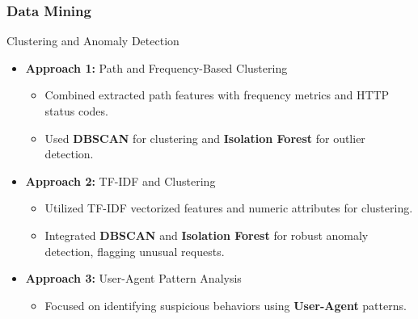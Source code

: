 \documentclass[10pt, a4paper]{beamer}
\begin{document}
	
	\begin{frame}
		\frametitle{Data Mining}
		
		\begin{block}{Clustering and Anomaly Detection}
			
			\begin{itemize}
				\item \textbf{Approach 1:} Path and Frequency-Based Clustering
				\begin{itemize}
					\item Combined extracted path features with frequency metrics and HTTP status codes.
					\item Used \textbf{DBSCAN} for clustering and \textbf{Isolation Forest} for outlier detection.
				\end{itemize}
				\item \textbf{Approach 2:} TF-IDF and Clustering
				\begin{itemize}
					\item Utilized TF-IDF vectorized features and numeric attributes for clustering.
					\item Integrated \textbf{DBSCAN} and \textbf{Isolation Forest} for robust anomaly detection, flagging unusual requests.
				\end{itemize}
				
				\item \textbf{Approach 3:} User-Agent Pattern Analysis
				\begin{itemize}
					\item Focused on identifying suspicious behaviors using \textbf{User-Agent} patterns.
				\end{itemize}
			\end{itemize}
		\end{block}
		
	\end{frame}
\end{document}
